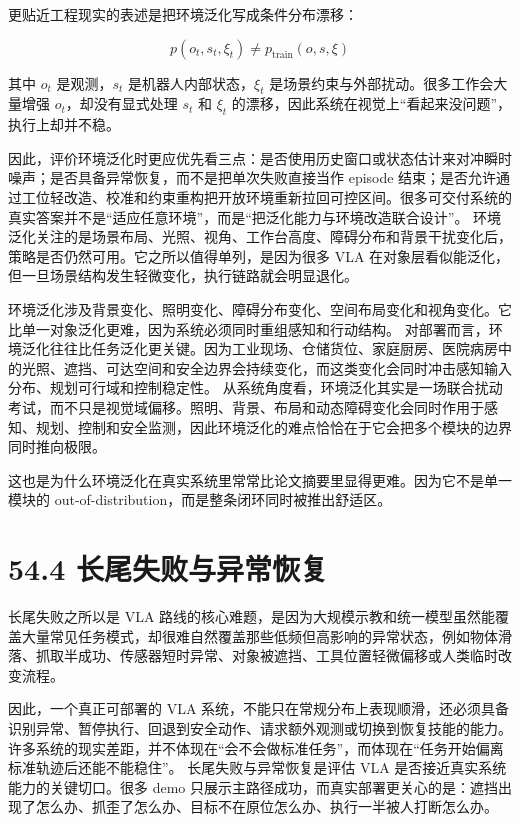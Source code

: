 更贴近工程现实的表述是把环境泛化写成条件分布漂移：

\begin{equation*}
p(o_t, s_t, \xi_t) \neq p_{\mathrm{train}}(o, s, \xi)
\end{equation*}

其中 \(o_t\) 是观测，\(s_t\) 是机器人内部状态，\(\xi_t\) 是场景约束与外部扰动。很多工作会大量增强 \(o_t\)，却没有显式处理 \(s_t\) 和 \(\xi_t\) 的漂移，因此系统在视觉上“看起来没问题”，执行上却并不稳。

因此，评价环境泛化时更应优先看三点：是否使用历史窗口或状态估计来对冲瞬时噪声；是否具备异常恢复，而不是把单次失败直接当作 episode 结束；是否允许通过工位轻改造、校准和约束重构把开放环境重新拉回可控区间。很多可交付系统的真实答案并不是“适应任意环境”，而是“把泛化能力与环境改造联合设计”。 环境泛化关注的是场景布局、光照、视角、工作台高度、障碍分布和背景干扰变化后，策略是否仍然可用。它之所以值得单列，是因为很多 VLA 在对象层看似能泛化，但一旦场景结构发生轻微变化，执行链路就会明显退化。

环境泛化涉及背景变化、照明变化、障碍分布变化、空间布局变化和视角变化。它比单一对象泛化更难，因为系统必须同时重组感知和行动结构。 对部署而言，环境泛化往往比任务泛化更关键。因为工业现场、仓储货位、家庭厨房、医院病房中的光照、遮挡、可达空间和安全边界会持续变化，而这类变化会同时冲击感知输入分布、规划可行域和控制稳定性。 从系统角度看，环境泛化其实是一场联合扰动考试，而不只是视觉域偏移。照明、背景、布局和动态障碍变化会同时作用于感知、规划、控制和安全监测，因此环境泛化的难点恰恰在于它会把多个模块的边界同时推向极限。

这也是为什么环境泛化在真实系统里常常比论文摘要里显得更难。因为它不是单一模块的 out-of-distribution，而是整条闭环同时被推出舒适区。

\section*{54.4 长尾失败与异常恢复}


长尾失败之所以是 VLA 路线的核心难题，是因为大规模示教和统一模型虽然能覆盖大量常见任务模式，却很难自然覆盖那些低频但高影响的异常状态，例如物体滑落、抓取半成功、传感器短时异常、对象被遮挡、工具位置轻微偏移或人类临时改变流程。

因此，一个真正可部署的 VLA 系统，不能只在常规分布上表现顺滑，还必须具备识别异常、暂停执行、回退到安全动作、请求额外观测或切换到恢复技能的能力。许多系统的现实差距，并不体现在“会不会做标准任务”，而体现在“任务开始偏离标准轨迹后还能不能稳住”。 长尾失败与异常恢复是评估 VLA 是否接近真实系统能力的关键切口。很多 demo 只展示主路径成功，而真实部署更关心的是：遮挡出现了怎么办、抓歪了怎么办、目标不在原位怎么办、执行一半被人打断怎么办。

